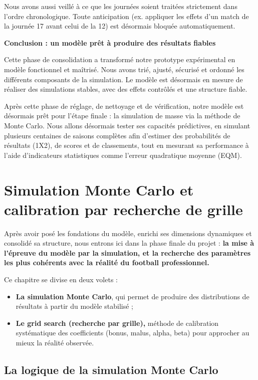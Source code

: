 \documentclass[12pt]{report}
\begin{document}
Nous avons aussi veillé à ce que les journées soient traitées strictement dans l’ordre chronologique. Toute anticipation (ex. appliquer les effets d’un match de la journée 17 avant celui de la 12) est désormais bloquée automatiquement.

\textbf{Conclusion : un modèle prêt à produire des résultats fiables}

Cette phase de consolidation a transformé notre prototype expérimental en modèle fonctionnel et maîtrisé. Nous avons trié, ajusté, sécurisé et ordonné les différents composants de la simulation. Le modèle est désormais en mesure de réaliser des simulations stables, avec des effets contrôlés et une structure fiable.

Après cette phase de réglage, de nettoyage et de vérification, notre modèle est désormais prêt pour l’étape finale : la simulation de masse via la méthode de Monte Carlo. Nous allons désormais tester ses capacités prédictives, en simulant plusieurs centaines de saisons complètes afin d’estimer des probabilités de résultats (1X2), de scores et de classements, tout en mesurant sa performance à l’aide d’indicateurs statistiques comme l’erreur quadratique moyenne (EQM).

\chapter{Simulation Monte Carlo et calibration par recherche de grille}
Après avoir posé les fondations du modèle, enrichi ses dimensions dynamiques et consolidé sa structure, nous entrons ici dans la phase finale du projet : \textbf{la mise à l’épreuve du modèle par la simulation, et la recherche des paramètres les plus cohérents avec la réalité du football professionnel.}

Ce chapitre se divise en deux volets :
\begin{itemize}
  \item \textbf{La simulation Monte Carlo}, qui permet de produire des distributions de résultats à partir du modèle stabilisé ;
  \item \textbf{ Le grid search (recherche par grille),} méthode de calibration systématique des coefficients (bonus, malus, alpha, beta) pour approcher au mieux la réalité observée.
\end{itemize}

\section{La logique de la simulation Monte Carlo}
\end{document}
